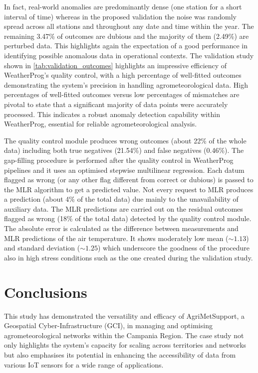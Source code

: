\documentclass[authoryear,preprint,review,12pt]{elsarticle}
\begin{document}
In fact, real-world anomalies are predominantly dense (one station for a short interval of time) whereas in the proposed validation the noise was randomly spread across all stations and throughout any date and time within the year. 
The remaining 3.47\% of outcomes are dubious and the majority of them (2.49\%) are perturbed data. This highlights again the expectation of a good performance in identifying possible anomalous data in operational contexts.
The validation study shown in \cref{tab:validation_outcomes} highlights an impressive efficiency of WeatherProg's quality control, with a high percentage of well-fitted outcomes demonstrating the system's precision in handling agrometeorological data. 
High percentages of well-fitted outcomes versus low percentages of mismatches are pivotal to state that a significant majority of data points were accurately processed. 
This indicates a robust anomaly detection capability within WeatherProg, essential for reliable agrometeorological analysis.

The quality control module produces wrong outcomes (about 22\% of the whole data) including both true negatives (21.54\%) and false negatives (0.46\%).
The gap-filling procedure is performed after the quality control in WeatherProg pipelines and it uses an optimised stepwise multilinear regression.
Each datum flagged as wrong (or any other flag different from correct or dubious) is passed to the MLR algorithm to get a predicted value.
Not every request to MLR produces a prediction (about 4\% of the total data) due mainly to the unavailability of auxiliary data.
The MLR predictions are carried out on the residual outcomes flagged as wrong (18\% of the total data) detected by the quality control module.
The absolute error is calculated as the difference between measurements and MLR predictions of the air temperature.
It shows moderately low mean ($\sim1.13$) and standard deviation ($\sim1.25$) which underscore the goodness of the procedure also in high stress conditions such as the one created during the validation study.


\section{Conclusions}
This study has demonstrated the versatility and efficacy of AgriMetSupport, a Geospatial Cyber-Infrastructure (GCI), in managing and optimising agrometeorological networks within the Campania Region.
The case study not only highlights the system's capacity for scaling across territories and networks but also emphasises its potential in enhancing the accessibility of data from various IoT sensors for a wide range of applications.
\end{document}
